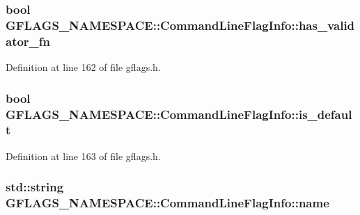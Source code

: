 \subsubsection[{\texorpdfstring{has\+\_\+validator\+\_\+fn}{has_validator_fn}}]{\setlength{\rightskip}{0pt plus 5cm}bool G\+F\+L\+A\+G\+S\+\_\+\+N\+A\+M\+E\+S\+P\+A\+C\+E\+::\+Command\+Line\+Flag\+Info\+::has\+\_\+validator\+\_\+fn}\hypertarget{structGFLAGS__NAMESPACE_1_1CommandLineFlagInfo_a0942bc076c1307b2ab7f3c6d6c7ae4c3}{}\label{structGFLAGS__NAMESPACE_1_1CommandLineFlagInfo_a0942bc076c1307b2ab7f3c6d6c7ae4c3}


Definition at line 162 of file gflags.\+h.

\subsubsection[{\texorpdfstring{is\+\_\+default}{is_default}}]{\setlength{\rightskip}{0pt plus 5cm}bool G\+F\+L\+A\+G\+S\+\_\+\+N\+A\+M\+E\+S\+P\+A\+C\+E\+::\+Command\+Line\+Flag\+Info\+::is\+\_\+default}\hypertarget{structGFLAGS__NAMESPACE_1_1CommandLineFlagInfo_a9c9ae9de1ba9e9b591c21a761f9f08c2}{}\label{structGFLAGS__NAMESPACE_1_1CommandLineFlagInfo_a9c9ae9de1ba9e9b591c21a761f9f08c2}


Definition at line 163 of file gflags.\+h.

\subsubsection[{\texorpdfstring{name}{name}}]{\setlength{\rightskip}{0pt plus 5cm}std\+::string G\+F\+L\+A\+G\+S\+\_\+\+N\+A\+M\+E\+S\+P\+A\+C\+E\+::\+Command\+Line\+Flag\+Info\+::name}\hypertarget{structGFLAGS__NAMESPACE_1_1CommandLineFlagInfo_af56a81d2c7aca29203746976004abfc2}{}\label{structGFLAGS__NAMESPACE_1_1CommandLineFlagInfo_af56a81d2c7aca29203746976004abfc2}


